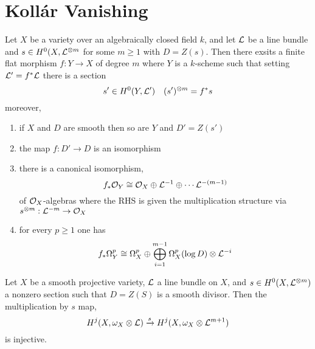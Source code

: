 \documentclass[12pt]{article}
\begin{document}
\section{Koll\'{a}r Vanishing}

\begin{lemma} 
Let $X$ be a variety over an algebraically closed field $k$, and let $\mathcal{L}$ be a line bundle and $s \in H^0(X, \mathcal{L}^{\otimes m}$ for some $m \ge 1$ with $D = Z(s)$. Then there exsits a finite flat morphism $f : Y \to X$ of degree $m$ where $Y$ is a $k$-scheme such that setting $\mathcal{L}' = f^* \mathcal{L}$ there is a section
\[ s' \in H^0(Y, \mathcal{L}') \quad (s')^{\otimes m} = f^* s \]
moreover,
\begin{enumerate}
\item if $X$ and $D$ are smooth then so are $Y$ and $D' = Z(s')$
\item the map $f : D' \to D$ is an isomorphism
\item there is a canonical isomorphism,
\[ f_* \mathcal{O}_{Y} \cong \mathcal{O}_{X} \oplus \mathcal{L}^{-1} \oplus \cdots \mathcal{L}^{-(m-1)} \]
of $\mathcal{O}_{X}$-algebras where the RHS is given the multiplication structure via $s^{\otimes m} : \mathcal{L}^{-m} \to \mathcal{O}_{X}$
\item for every $p \ge 1$ one has
\[ f_* \Omega^p_Y \cong \Omega^p_X \oplus \bigoplus_{i = 1}^{m-1} \Omega_X^p(\log D) \otimes \mathcal{L}^{-i} \]
\end{enumerate}
\end{lemma}

\begin{theorem}
Let $X$ be a smooth projective variety, $\mathcal{L}$ a line bundle on $X$, and $s \in H^0(X, \mathcal{L}^{\otimes m})$ a nonzero section such that $D = Z(S)$ is a smooth divisor. Then the multiplication by $s$ map,
\[ H^j(X, \omega_X \otimes \mathcal{L}) \xrightarrow{s} H^j(X, \omega_X \otimes \mathcal{L}^{m+1}) \]
is injective. 
\end{theorem}
\end{document}
